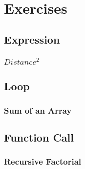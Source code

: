 \documentclass[usepdftitle=false,professionalfonts,compress ]{beamer}
\begin{document}
\section{Exercises}
		
\subsection{Expression}

{
\begin{frame}\frametitle{$Distance^2$}

\end{frame}}

\subsection{Loop}

{
\begin{frame}\frametitle{Sum of an Array}

\end{frame}}

\subsection{Function Call}

{
\begin{frame}\frametitle{Recursive Factorial}

\end{frame}}
\end{document}
